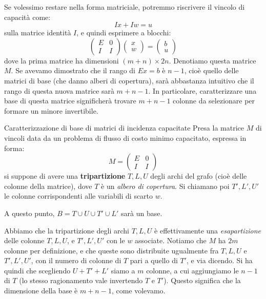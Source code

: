 \documentclass[a4paper,11pt]{article}
\begin{document}
Se volessimo restare nella forma matriciale, potremmo riscrivere il vincolo di capacità come:
$$
Ix + Iw = u
$$
sulla matrice identità $I$, e quindi esprimere a blocchi:
$$
\begin{pmatrix}
	E & 0 \\ 
	I & I
\end{pmatrix}
\begin{pmatrix}
	x \\ w
\end{pmatrix}
=
\begin{pmatrix}
	b \\ u
\end{pmatrix}
$$
dove la prima matrice ha dimensioni $(m + n) \times 2n$.
Denotiamo questa matrice $M$.
Se avevamo dimostrato che il rango di $Ex = b$ è $n - 1$, cioè quello delle matrici di base (che danno alberi di copertura), sarà abbastanza intuitivo che il rango di questa nuova matrice sarà $m + n - 1$.
In particolare, caratterizzare una base di questa matrice significherà trovare $m + n - 1$ colonne da selezionare per formare un minore invertibile.

\begin{theorem}{Caratterizzazione di base di matrici di incidenza capacitate}
	Presa la matrice $M$ di vincoli data da un problema di flusso di costo minimo capacitato, espressa in forma:
$$
M=
\begin{pmatrix}
	E & 0 \\ 
	I & I
\end{pmatrix}
$$
si suppone di avere una \textbf{tripartizione} $T, L, U$ degli archi del grafo (cioè delle colonne della matrice), dove $T$ è un \textit{albero di copertura}. 
Si chiamano poi $T', L', U'$ le colonne corrispondenti alle variabili di scarto $w$.

A questo punto, $B = T \cup U \cup T' \cup L'$ sarà un base. 

\end{theorem}

Abbiamo che la tripartizione degli archi $T, L, U$ è effettivamente una \textit{esapartizione} delle colonne $T, L, U$, e $T', L', U'$ con le $w$ associate.
Notiamo che $M$ ha $2m$ colonne per definizione, e che queste sono distribuite ugualmente fra $T, L, U$ e $T', L', U'$, con il numero di colonne di $T$ pari a quello di $T'$, e via dicendo.
Si ha quindi che scegliendo $U + T' + L'$ siamo a $m$ colonne, a cui aggiungiamo le $n-1$ di $T$ (lo stesso ragionamento vale invertendo $T$ e $T'$).
Questo significa che la dimensione della base è $m + n - 1$, come volevamo.
\end{document}
